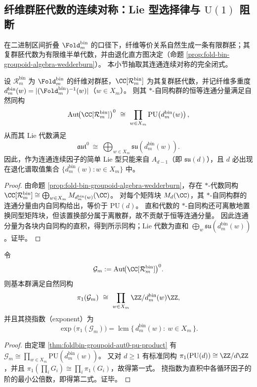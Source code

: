 \subsection{纤维群胚代数的连续对称：Lie 型选择律与 \texorpdfstring{$\mathrm{U}(1)$}{U(1)} 阻断}\label{subsec:foldbin-groupoid-aut-lie-selection}
在二进制区间折叠 \(\Fold_m^{\mathrm{bin}}\) 的口径下，纤维等价关系自然生成一条有限群胚；其复群胚代数为有限维半单代数，并由退化直方图决定（命题 \ref{prop:fold-bin-groupoid-algebra-wedderburn}）。
本小节抽取其连通连续对称的完全闭式。

\begin{theorem}\label{thm:foldbin-groupoid-aut0-pu-product}
设 \(\mathcal{R}_m^{\mathrm{bin}}\) 为 \(\Fold_m^{\mathrm{bin}}\) 的纤维对群胚，\(\CC[\mathcal{R}_m^{\mathrm{bin}}]\) 为其复群胚代数，并记纤维多重度 \(d_m^{\mathrm{bin}}(w)=|(\Fold_m^{\mathrm{bin}})^{-1}(w)|\)（\(w\in X_m\)）。
则其 \(\ast\)-自同构群的恒等连通分量满足自然同构
\[
\mathrm{Aut}\!\bigl(\CC[\mathcal{R}_m^{\mathrm{bin}}]\bigr)^0
\ \cong\
\prod_{w\in X_m}\mathrm{PU}\!\left(d_m^{\mathrm{bin}}(w)\right),
\]
从而其 Lie 代数满足
\[
\mathfrak{aut}^0
\ \cong\
\bigoplus_{w\in X_m}\mathfrak{su}\!\left(d_m^{\mathrm{bin}}(w)\right).
\]
因此，作为连通连续因子的简单 Lie 型只能来自 \(A_{d-1}\)（即 \(\mathfrak{su}(d)\)），且 \(d\) 必出现在退化谱取值集合 \(\{d_m^{\mathrm{bin}}(w):w\in X_m\}\) 中。
\end{theorem}
\begin{proof}
由命题 \ref{prop:fold-bin-groupoid-algebra-wedderburn}，存在 \(\ast\)-代数同构
\(
\CC[\mathcal{R}_m^{\mathrm{bin}}]\cong \bigoplus_{w\in X_m} M_{d_m^{\mathrm{bin}}(w)}(\CC)
\)。
对每个矩阵块 \(M_d(\CC)\)，其 \(\ast\)-自同构群的连通分量由内自同构给出，等价于 \(\mathrm{PU}(d)\)。
直和代数的 \(\ast\)-自同构还可离散地置换同型矩阵块，但该置换部分属于离散群，故不贡献于恒等连通分量。
因此连通分量为各块内自同构的直积，得到所示同构；Lie 代数为直和 \(\bigoplus_w\mathfrak{su}(d_m^{\mathrm{bin}}(w))\)。证毕。
\end{proof}

\begin{proposition}[基本群分解与挠指数]\label{prop:foldbin-groupoid-aut0-pi1-torsion-exponent}
令
\[
\mathcal G_m:=\mathrm{Aut}\!\bigl(\CC[\mathcal{R}_m^{\mathrm{bin}}]\bigr)^0.
\]
则基本群满足自然同构
\[
\pi_1(\mathcal G_m)\ \cong\ \prod_{w\in X_m}\ZZ/d_m^{\mathrm{bin}}(w)\ZZ,
\]
并且其挠指数（exponent）为
\[
\exp\bigl(\pi_1(\mathcal G_m)\bigr)
=\operatorname{lcm}\{\,d_m^{\mathrm{bin}}(w):\ w\in X_m\,\}.
\]
\end{proposition}
\begin{proof}
由定理 \ref{thm:foldbin-groupoid-aut0-pu-product} 有
\(
\mathcal G_m\cong\prod_{w\in X_m}\mathrm{PU}(d_m^{\mathrm{bin}}(w))
\)。
又对 \(d\ge 1\) 有标准同构 \(\pi_1(\mathrm{PU}(d))\cong \ZZ/d\ZZ\)，并且
\(
\pi_1(\prod_i G_i)\cong\prod_i\pi_1(G_i)
\)，故得第一式。
挠指数为直积中各循环因子的阶的最小公倍数，即得第二式。证毕。
\end{proof}

